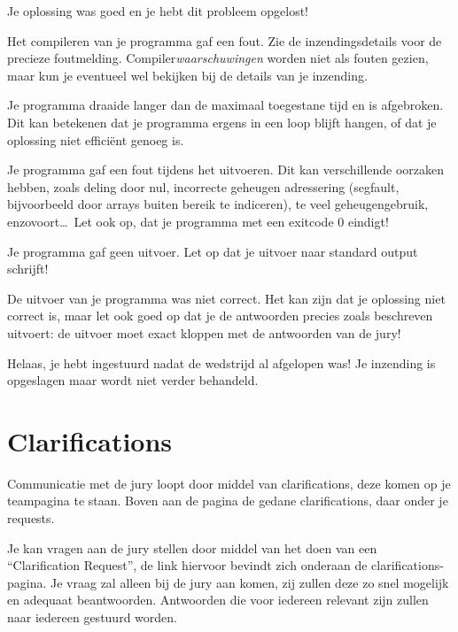 \documentclass[11pt,a4paper]{article}
\begin{document}
\begin{description}[\setleftmargin{4.5cm}]
\item[CORRECT]
Je oplossing was goed en je hebt dit probleem opgelost!

\item[COMPILER-ERROR]
Het compileren van je programma gaf een fout. Zie de inzendingsdetails
voor de precieze foutmelding. Compiler\emph{waarschuwingen} worden
niet als fouten gezien, maar kun je eventueel wel bekijken bij de
details van je inzending.

\item[TIMELIMIT]
Je programma draaide langer dan de maximaal toegestane tijd en is
afgebroken. Dit kan betekenen dat je programma ergens in een loop
blijft hangen, of dat je oplossing niet effici\"ent genoeg is.

\item[RUN-ERROR]
Je programma gaf een fout tijdens het uitvoeren. Dit kan verschillende
oorzaken hebben, zoals deling door nul, incorrecte geheugen adressering
(segfault, bijvoorbeeld door arrays buiten bereik te indiceren), te
veel geheugengebruik, enzovoort\dots\ 
Let ook op, dat je programma met een exitcode 0 eindigt!

\item[NO-OUTPUT]
Je programma gaf geen uitvoer. Let op dat je uitvoer naar standard
output schrijft!

\item[WRONG-ANSWER]
De uitvoer van je programma was niet correct. Het kan zijn dat je
oplossing niet correct is, maar let ook goed op dat je de antwoorden
precies zoals beschreven uitvoert: de uitvoer moet exact kloppen met
de antwoorden van de jury!

\item[TOO-LATE]
Helaas, je hebt ingestuurd nadat de wedstrijd al afgelopen was!
Je inzending is opgeslagen maar wordt niet verder behandeld.
\end{description}

\section{Clarifications}

Communicatie met de jury loopt door middel van clarifications, deze
komen op je teampagina te staan.  Boven aan de pagina de gedane
clarifications, daar onder je requests.

Je kan vragen aan de jury stellen door middel van het doen van een
``Clarification Request'', de link hiervoor bevindt zich onderaan de
clarifications-pagina.  Je vraag zal alleen bij de jury aan komen, zij
zullen deze zo snel mogelijk en adequaat beantwoorden. Antwoorden die
voor iedereen relevant zijn zullen naar iedereen gestuurd worden.
\end{document}
